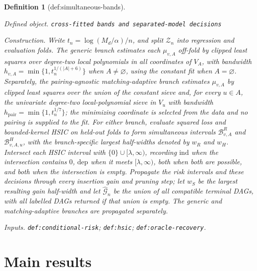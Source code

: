 \documentclass{article}
\newtheorem{definition}{Definition}
\begin{document}
\begin{definition}[def:simultaneous-bands]\label{def:simultaneous-bands}
\par\smallskip\noindent\emph{Defined object.} \texttt{cross-\allowbreak{}fitted bands and separated-\allowbreak{}model decisions}
\par\smallskip\noindent\emph{Construction.} Write \(t_n=\log(M_d/\alpha)/n\), and split \(\mathcal Z_n\) into regression and evaluation folds. The generic branch estimates each \(\mu_{v,A}\) off-fold by clipped least squares over degree-two local polynomials in all coordinates of \(V_A\), with bandwidth \(h_{v,A}=\min\{1,t_n^{1/(|A|+6)}\}\) when \(A\ne\varnothing\), using the constant fit when \(A=\varnothing\). Separately, the pairing-agnostic matching-adaptive branch estimates \(\mu_{v,A}\) by clipped least squares over the union of the constant sieve and, for every \(u\in A\), the univariate degree-two local-polynomial sieve in \(V_u\) with bandwidth \(h_{\mathrm{pair}}=\min\{1,t_n^{1/7}\}\); the minimizing coordinate is selected from the data and no pairing is supplied to the fit. For either branch, evaluate squared loss and bounded-kernel HSIC on held-out folds to form simultaneous intervals \(\mathcal B^R_{v,A}\) and \(\mathcal B^H_{v,A,u}\), with the branch-specific largest half-widths denoted by \(w_R\) and \(w_H\). Intersect each HSIC interval with \(\{0\}\cup[\lambda,\infty)\), recording \(\mathrm{ind}\) when the intersection contains \(0\), \(\mathrm{dep}\) when it meets \([\lambda,\infty)\), both when both are possible, and both when the intersection is empty. Propagate the risk intervals and these decisions through every insertion gain and pruning step; let \(w_S\) be the largest resulting gain half-width and let \(\widehat{\mathcal G}_n\) be the union of all compatible terminal DAGs, with all labelled DAGs returned if that union is empty. The generic and matching-adaptive branches are propagated separately.
\par\smallskip\noindent\emph{Inputs.} \texttt{def:\allowbreak{}conditional-\allowbreak{}risk}; \texttt{def:\allowbreak{}hsic}; \texttt{def:\allowbreak{}oracle-\allowbreak{}recovery}.
\end{definition}

\section{Main results}
\end{document}
